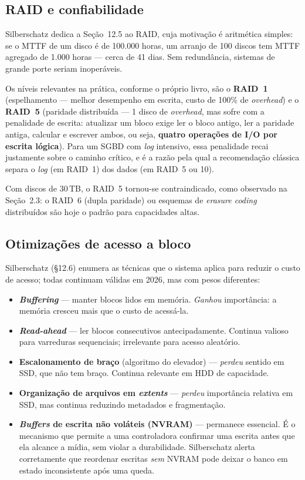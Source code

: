 \documentclass[11pt,a4paper]{article}
\begin{document}
\subsection{RAID e confiabilidade}

Silberschatz dedica a Seção~12.5 ao RAID, cuja motivação é aritmética simples: se o MTTF de
um disco é de 100.000 horas, um arranjo de 100 discos tem MTTF agregado de 1.000 horas ---
cerca de 41 dias. Sem redundância, sistemas de grande porte seriam inoperáveis.

Os níveis relevantes na prática, conforme o próprio livro, são o \textbf{RAID~1}
(espelhamento --- melhor desempenho em escrita, custo de 100\% de \emph{overhead}) e o
\textbf{RAID~5} (paridade distribuída --- 1 disco de \emph{overhead}, mas sofre com a
penalidade de escrita: atualizar um bloco exige ler o bloco antigo, ler a paridade antiga,
calcular e escrever ambos, ou seja, \textbf{quatro operações de I/O por escrita lógica}).
Para um SGBD com \emph{log} intensivo, essa penalidade recai justamente sobre o caminho
crítico, e é a razão pela qual a recomendação clássica separa o \emph{log} (em RAID~1) dos
dados (em RAID~5 ou 10).

Com discos de 30\,TB, o RAID~5 tornou-se contraindicado, como observado na Seção~2.3: o
RAID~6 (dupla paridade) ou esquemas de \emph{erasure coding} distribuídos são hoje o padrão
para capacidades altas.

\subsection{Otimizações de acesso a bloco}

Silberschatz (§12.6) enumera as técnicas que o sistema aplica para reduzir o custo de
acesso; todas continuam válidas em 2026, mas com pesos diferentes:

\begin{itemize}
\item \textbf{\emph{Buffering}} --- manter blocos lidos em memória. \emph{Ganhou}
      importância: a memória cresceu mais que o custo de acessá-la.
\item \textbf{\emph{Read-ahead}} --- ler blocos consecutivos antecipadamente. Continua
      valioso para varreduras sequenciais; irrelevante para acesso aleatório.
\item \textbf{Escalonamento de braço} (algoritmo do elevador) --- \emph{perdeu} sentido em
      SSD, que não tem braço. Continua relevante em HDD de capacidade.
\item \textbf{Organização de arquivos em \emph{extents}} --- \emph{perdeu} importância
      relativa em SSD, mas continua reduzindo metadados e fragmentação.
\item \textbf{\emph{Buffers} de escrita não voláteis (NVRAM)} --- permanece essencial. É o
      mecanismo que permite a uma controladora confirmar uma escrita antes que ela alcance
      a mídia, sem violar a durabilidade. Silberschatz alerta corretamente que reordenar
      escritas \emph{sem} NVRAM pode deixar o banco em estado inconsistente após uma queda.
\end{itemize}
\end{document}

